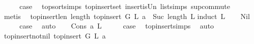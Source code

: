 \begin{isabellebody}
\ \ \isamarkupfalse%
\ \isamarkupfalse%
\ {\isacharquery}{\kern0pt}case\ \isamarkupfalse%
\ top{\isacharunderscore}{\kern0pt}sort{\isachardot}{\kern0pt}simps{\isacharparenleft}{\kern0pt}{}{\isacharparenright}{\kern0pt}\ top{\isacharunderscore}{\kern0pt}insert{\isacharunderscore}{\kern0pt}set\ insert{\isacharunderscore}{\kern0pt}is{\isacharunderscore}{\kern0pt}Un\ list{\isachardot}{\kern0pt}simps{\isacharparenleft}{\kern0pt}{}{}{\isacharparenright}{\kern0pt}\ sup{\isacharunderscore}{\kern0pt}commute\isanewline
\ \ \ \ \isamarkupfalse%
\ {\isacharparenleft}{\kern0pt}metis{\isacharparenright}{\kern0pt}\ \isanewline
{}\isamarkupfalse%
%
\endisatagproof
{\isafoldproof}%
%
\isadelimproof
\isanewline
%
\endisadelimproof
\isanewline
\isanewline
{}\isamarkupfalse%
\ top{\isacharunderscore}{\kern0pt}insert{\isacharunderscore}{\kern0pt}len{\isacharcolon}{\kern0pt}\ {\isachardoublequoteopen}length\ {\isacharparenleft}{\kern0pt}top{\isacharunderscore}{\kern0pt}insert\ G\ L\ a{\isacharparenright}{\kern0pt}\ {\isacharequal}{\kern0pt}\ Suc\ {\isacharparenleft}{\kern0pt}length\ L{\isacharparenright}{\kern0pt}{\isachardoublequoteclose}\isanewline
%
\isadelimproof
%
\endisadelimproof
%
\isatagproof
{}\isamarkupfalse%
{\isacharparenleft}{\kern0pt}induct\ L{\isacharparenright}{\kern0pt}\isanewline
\ \ \isamarkupfalse%
\ Nil\isanewline
\ \ \isamarkupfalse%
\ \isamarkupfalse%
\ {\isacharquery}{\kern0pt}case\ \isamarkupfalse%
\ auto\isanewline
{}\isamarkupfalse%
\isanewline
\ \ \isamarkupfalse%
\ {\isacharparenleft}{\kern0pt}Cons\ a\ L{\isacharparenright}{\kern0pt}\isanewline
\ \ \isamarkupfalse%
\ \isamarkupfalse%
\ {\isacharquery}{\kern0pt}case\ \isamarkupfalse%
\ top{\isacharunderscore}{\kern0pt}insert{\isachardot}{\kern0pt}simps{\isacharparenleft}{\kern0pt}{}{\isacharparenright}{\kern0pt}\ \isamarkupfalse%
\ auto\isanewline
{}\isamarkupfalse%
%
\endisatagproof
{\isafoldproof}%
%
\isadelimproof
\isanewline
%
\endisadelimproof
\isanewline
{}\isamarkupfalse%
\ top{\isacharunderscore}{\kern0pt}insert{\isacharunderscore}{\kern0pt}not{\isacharunderscore}{\kern0pt}nil{\isacharcolon}{\kern0pt}\ {\isachardoublequoteopen}top{\isacharunderscore}{\kern0pt}insert\ G\ L\ a\ {\isasymnoteq}\ {\isacharbrackleft}{\kern0pt}{\isacharbrackright}{\kern0pt}{\isachardoublequoteclose}\isanewline

\end{isabellebody}
